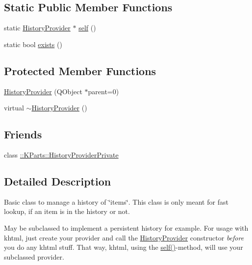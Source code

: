 \subsection*{Static Public Member Functions}
\begin{DoxyCompactItemize}
\item 
static \hyperlink{classKParts_1_1HistoryProvider}{History\+Provider} $\ast$ \hyperlink{classKParts_1_1HistoryProvider_a3c2fe96b915ebe5e310bbcbd8499002d}{self} ()
\item 
static bool \hyperlink{classKParts_1_1HistoryProvider_a5d7683f8804027d0a4106ace9a01c926}{exists} ()
\end{DoxyCompactItemize}
\subsection*{Protected Member Functions}
\begin{DoxyCompactItemize}
\item 
\hyperlink{classKParts_1_1HistoryProvider_a6b074dce67d7c90e6c795ef961272674}{History\+Provider} (Q\+Object $\ast$parent=0)
\item 
virtual \hyperlink{classKParts_1_1HistoryProvider_ad1c5d49be5dd48a6fd6776b55afa13d9}{$\sim$\+History\+Provider} ()
\end{DoxyCompactItemize}
\subsection*{Friends}
\begin{DoxyCompactItemize}
\item 
class \hyperlink{classKParts_1_1HistoryProvider_aa6bf68e5e8d7a54d38811147d3243489}{\+::\+K\+Parts\+::\+History\+Provider\+Private}
\end{DoxyCompactItemize}


\subsection{Detailed Description}
Basic class to manage a history of \char`\"{}items\char`\"{}. This class is only meant for fast lookup, if an item is in the history or not.

May be subclassed to implement a persistent history for example. For usage with khtml, just create your provider and call the \hyperlink{classKParts_1_1HistoryProvider}{History\+Provider} constructor {\itshape before} you do any khtml stuff. That way, khtml, using the \hyperlink{classKParts_1_1HistoryProvider_a3c2fe96b915ebe5e310bbcbd8499002d}{self()}-\/method, will use your subclassed provider.

